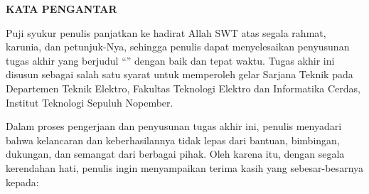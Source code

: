 \begin{center}
  \Large
  \textbf{KATA PENGANTAR}
\end{center}


\vspace{2ex}

Puji syukur penulis panjatkan ke hadirat Allah SWT atas segala rahmat,
karunia, dan petunjuk-Nya, sehingga penulis dapat menyelesaikan
penyusunan tugas akhir yang berjudul ``\tatitle{}'' dengan baik dan
tepat waktu. Tugas akhir ini disusun sebagai salah satu syarat untuk
memperoleh gelar Sarjana Teknik pada Departemen Teknik Elektro,
Fakultas Teknologi Elektro dan Informatika Cerdas, Institut Teknologi
Sepuluh Nopember.

Dalam proses pengerjaan dan penyusunan tugas akhir ini, penulis
menyadari bahwa kelancaran dan keberhasilannya tidak lepas dari
bantuan, bimbingan, dukungan, dan semangat dari berbagai pihak.
Oleh karena itu, dengan segala kerendahan hati, penulis ingin
menyampaikan terima kasih yang sebesar-besarnya kepada:

